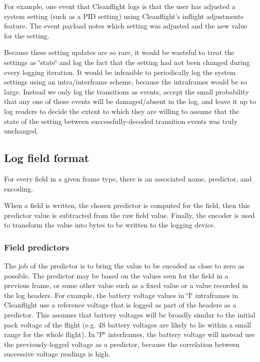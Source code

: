 For example, one event that Cleanflight logs is that the user has adjusted a system setting (such as a P\+I\+D setting) using Cleanflight's inflight adjustments feature. The event payload notes which setting was adjusted and the new value for the setting.

Because these setting updates are so rare, it would be wasteful to treat the settings as \char`\"{}state\char`\"{} and log the fact that the setting had not been changed during every logging iteration. It would be infeasible to periodically log the system settings using an intra/interframe scheme, because the intraframes would be so large. Instead we only log the transitions as events, accept the small probability that any one of those events will be damaged/absent in the log, and leave it up to log readers to decide the extent to which they are willing to assume that the state of the setting between successfully-\/decoded transition events was truly unchanged.

\subsection*{Log field format}

For every field in a given frame type, there is an associated name, predictor, and encoding.

When a field is written, the chosen predictor is computed for the field, then this predictor value is subtracted from the raw field value. Finally, the encoder is used to transform the value into bytes to be written to the logging device.

\subsubsection*{Field predictors}

The job of the predictor is to bring the value to be encoded as close to zero as possible. The predictor may be based on the values seen for the field in a previous frame, or some other value such as a fixed value or a value recorded in the log headers. For example, the battery voltage values in \char`\"{}\+I\char`\"{} intraframes in Cleanflight use a reference voltage that is logged as part of the headers as a predictor. This assumes that battery voltages will be broadly similar to the initial pack voltage of the flight (e.\+g. 4\+S battery voltages are likely to lie within a small range for the whole flight). In \char`\"{}\+P\char`\"{} interframes, the battery voltage will instead use the previously-\/logged voltage as a predictor, because the correlation between successive voltage readings is high.

